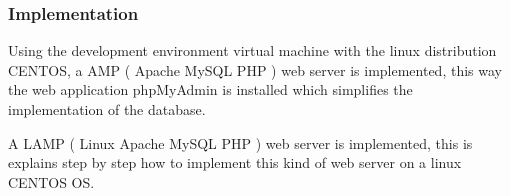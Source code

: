 %	
%	
\subsubsection{Implementation}
Using the development environment virtual machine with the linux distribution CENTOS, a AMP ( Apache MySQL PHP ) web server is implemented, this way the web application phpMyAdmin is installed which simplifies the implementation of the database.

A LAMP ( Linux Apache MySQL PHP ) web server is implemented, this is explains step by step how to implement this kind of web server on a linux CENTOS OS.
